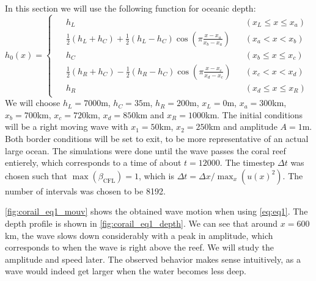In this section we will use the following function for oceanic depth:
\begin{equation}
    h_0(x) = \begin{cases}
        \begin{aligned}
            &h_L &&(x_L \le x \le x_a) \\
            &\frac{1}{2}(h_L + h_C) + \frac{1}{2}(h_L - h_C) \cos \left( \pi \frac{x-x_a}{x_b-x_a} \right) &&(x_a < x < x_b) \\
            &h_C &&(x_b \le x \le x_c) \\
            &\frac{1}{2}(h_R + h_C) - \frac{1}{2}(h_R - h_C) \cos \left( \pi \frac{x-x_c}{x_d-x_c} \right) &&(x_c < x < x_d) \\
            &h_R &&(x_d \le x \le x_R)
        \end{aligned}
    \end{cases}
\end{equation}
We will choose \(h_L = 7000\)m, \(h_C = 35\)m, \(h_R = 200\)m, \(x_L = 0\)m, \(x_a = 300\)km, \(x_b = 700\)km, \(x_c = 720\)km, \(x_d = 850\)km and \(x_R = 1000\)km. The initial conditions will be a right moving wave with \(x_1 = 50\)km, \(x_2 = 250\)km and amplitude \(A = 1\)m. Both border conditions will be set to exit, to be more representative of an actual large ocean. The simulations were done until the wave passes the coral reef entierely, which corresponds to a time of about \(t = 12000\). The timestep \(\Delta t\) was chosen such that \(\max(\beta_{\textrm{CFL}}) = 1\), which is \(\Delta t = \Delta x / \max_x(u(x)^2)\). The number of intervals was chosen to be 8192.

\autoref{fig:corail_eq1_mouv} shows the obtained wave motion when using \autoref{eq:eq1}. The depth profile is shown in \autoref{fig:corail_eq1_depth}. We can see that around \(x=600\)km, the wave slows down considerably with a peak in amplitude, which corresponds to when the wave is right above the reef. We will study the amplitude and speed later. The observed behavior makes sense intuitively, as a wave would indeed get larger when the water becomes less deep.

